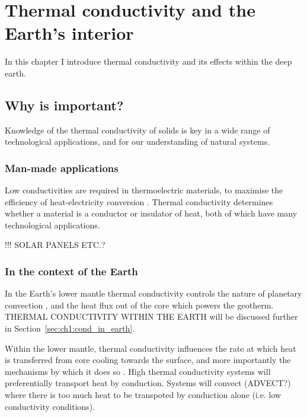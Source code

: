 \chapter{Thermal conductivity and the Earth's interior} %

\label{Chapter1} %

In this chapter I introduce thermal conductivity and its effects within the deep earth.

\section{Why is \tcs important?}
Knowledge of the thermal conductivity of solids is key in a wide range of technological applications, and for our understanding of natural systems.

\subsection{Man-made applications}
Low conductivities are required in thermoelectric materials, to maximise the efficiency of heat-electricity conversion \citep{Snyder2008}. Thermal conductivity determines whether a material is a conductor or insulator of heat, both of which have many technological applications.

!!! SOLAR PANELS ETC.?

\subsection{In the context of the Earth}
In the Earth's lower mantle thermal conductivity controls the nature of planetary convection \citep{Tosi2013}, and the heat flux out of the core which powers the geotherm. THERMAL CONDUCTIVITY WITHIN THE EARTH will be discussed further in Section~\ref{sec:ch1:cond_in_earth}.

Within the lower mantle, thermal conductivity influences the rate at which heat is transferred from core cooling towards the surface, and more importantly the mechanisms by which it does so \citep{Lay2008}. High thermal conductivity systems will preferentially transport heat by conduction. Systems will convect (ADVECT?) where there is too much heat to be transpoted by conduction alone (i.e. low conductivity conditions).


